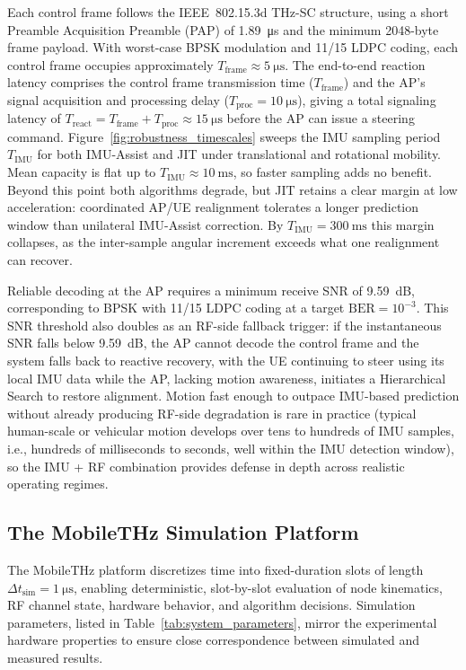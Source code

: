 \documentclass[fleqn,10pt]{wlscirep}
\newcommand{\rev}[1]{{\color{revblue}#1}}
\begin{document}
Each control frame follows the IEEE~802.15.3d THz-SC structure\cite{9269931}, using a short Preamble Acquisition Preamble (PAP) of \SI{1.89}{\micro\second} and the minimum 2048-byte frame payload. With worst-case BPSK modulation and 11/15 LDPC coding, each control frame occupies approximately $T_{\text{frame}} \approx \SI{5}{\micro\second}$. The end-to-end reaction latency comprises the control frame transmission time ($T_{\text{frame}}$) and the AP's signal acquisition and processing delay ($T_{\text{proc}} = \SI{10}{\micro\second}$), giving a total signaling latency of $T_{\text{react}} = T_{\text{frame}} + T_{\text{proc}} \approx \SI{15}{\micro\second}$ before the AP can issue a steering command. \rev{Figure~\ref{fig:robustness_timescales} sweeps the IMU sampling period $T_{\text{IMU}}$ for both IMU-Assist and JIT under translational and rotational mobility. Mean capacity is flat up to $T_{\text{IMU}} \approx \SI{10}{\milli\second}$, so faster sampling adds no benefit. Beyond this point both algorithms degrade, but JIT retains a clear margin at low acceleration: coordinated AP/UE realignment tolerates a longer prediction window than unilateral IMU-Assist correction. By $T_{\text{IMU}} = \SI{300}{\milli\second}$ this margin collapses, as the inter-sample angular increment exceeds what one realignment can recover.}

Reliable decoding at the AP requires a minimum receive SNR of \SI{9.59}{\deci\bel}, corresponding to BPSK with 11/15 LDPC coding at a target $\text{BER} = 10^{-3}$. \rev{This SNR threshold also doubles as an RF-side fallback trigger:} if the instantaneous SNR falls below \SI{9.59}{\deci\bel}, the AP cannot decode the control frame and the system falls back to reactive recovery, with the UE continuing to steer using its local IMU data while the AP, lacking motion awareness, initiates a Hierarchical Search to restore alignment. \rev{Motion fast enough to outpace IMU-based prediction without already producing RF-side degradation is rare in practice (typical human-scale or vehicular motion develops over tens to hundreds of IMU samples, i.e., hundreds of milliseconds to seconds, well within the IMU detection window), so the IMU + RF combination provides defense in depth across realistic operating regimes.}




\subsection*{The MobileTHz Simulation Platform}
The MobileTHz platform discretizes time into fixed-duration slots of length $\Delta t_{\text{sim}} = \SI{1}{\micro\second}$, enabling deterministic, slot-by-slot evaluation of node kinematics, RF channel state, hardware behavior, and algorithm decisions. Simulation parameters, listed in Table~\ref{tab:system_parameters}, mirror the experimental hardware properties to ensure close correspondence between simulated and measured results.
\end{document}
